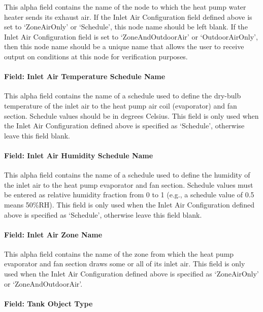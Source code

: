 This alpha field contains the name of the node to which the heat pump water heater sends its exhaust air. If the Inlet Air Configuration field defined above is set to `ZoneAirOnly' or `Schedule', this node name should be left blank. If the Inlet Air Configuration field is set to `ZoneAndOutdoorAir' or `OutdoorAirOnly', then this node name should be a unique name that allows the user to receive output on conditions at this node for verification purposes.

\paragraph{Field: Inlet Air Temperature Schedule Name}\label{field-inlet-air-temperature-schedule-name-1}

This alpha field contains the name of a schedule used to define the dry-bulb temperature of the inlet air to the heat pump air coil (evaporator) and fan section. Schedule values should be in degrees Celsius. This field is only used when the Inlet Air Configuration defined above is specified as `Schedule', otherwise leave this field blank.

\paragraph{Field: Inlet Air Humidity Schedule Name}\label{field-inlet-air-humidity-schedule-name-1}

This alpha field contains the name of a schedule used to define the humidity of the inlet air to the heat pump evaporator and fan section. Schedule values must be entered as relative humidity fraction from 0 to 1 (e.g., a schedule value of 0.5 means 50\%RH). This field is only used when the Inlet Air Configuration defined above is specified as `Schedule', otherwise leave this field blank.

\paragraph{Field: Inlet Air Zone Name}\label{field-inlet-air-zone-name-1}

This alpha field contains the name of the zone from which the heat pump evaporator and fan section draws some or all of its inlet air. This field is only used when the Inlet Air Configuration defined above is specified as `ZoneAirOnly' or `ZoneAndOutdoorAir'.

\paragraph{Field: Tank Object Type}\label{field-tank-object-type-1}


